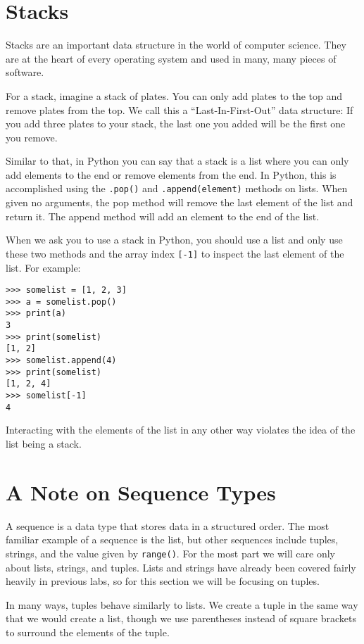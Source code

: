 \documentclass[11pt]{cselabheader}
\begin{document}
\pagebreak
\section{Stacks}
\label{sec:stacks}

Stacks are an important data structure in the world of computer
science. They are at the heart of every operating system and used in many, many
pieces of software.

For a stack, imagine a stack of plates. You can only add plates to the top and
remove plates from the top. We call this a ``Last-In-First-Out'' data structure:
If you add three plates to your stack, the last one you added will be the first
one you remove.

Similar to that, in Python you can say that a stack
is a list where you can only add elements to the end or remove elements from the
end. In Python, this is accomplished using the
\lstinline!.pop()! and \lstinline!.append(element)! methods on lists. When given
no arguments, the pop method will remove the last element of the list and return
it. The append method will add an element to the end of the list.

When we ask you to use a stack in Python, you should use a list and only use
these two methods and the array index \lstinline![-1]! to inspect the last
element of the list. For example:

\begin{lstlisting}[style=ipython]
>>> somelist = [1, 2, 3]
>>> a = somelist.pop()
>>> print(a)
3
>>> print(somelist)
[1, 2]
>>> somelist.append(4)
>>> print(somelist)
[1, 2, 4]
>>> somelist[-1]
4
\end{lstlisting}

Interacting with the elements of the list in any other way violates the
idea of the list being a stack.

\pagebreak

\section{A Note on Sequence Types}
A sequence is a data type that stores data in a structured order. The most familiar example of a sequence is the list, but other sequences include tuples, strings, and the value given by \lstinline{range()}. For the most part we will care only about lists, strings, and tuples. Lists and strings have already been covered fairly heavily in previous labs, so for this section we will be focusing on tuples.

In many ways, tuples behave similarly to lists. We create a tuple in the same way that we would create a list, though we use parentheses instead of square brackets to surround the elements of the tuple.
\end{document}
